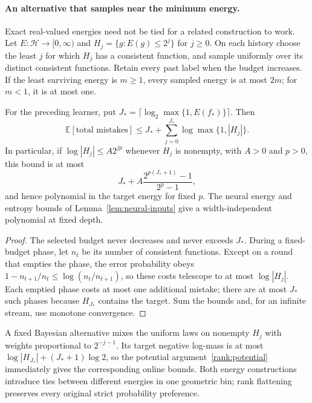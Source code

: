 \paragraph{An alternative that samples near the minimum energy.}
Exact real-valued energies need not be tied for a related construction
to work. Let $E:\mathcal H\to[0,\infty)$ and
$H_j=\{g:E(g)\le2^j\}$ for $j\ge0$. On each history choose the least $j$
for which $H_j$ has a consistent function, and sample uniformly over its
distinct consistent functions. Retain every past label when the budget
increases. If the least surviving energy is $m\ge1$, every sampled energy
is at most $2m$; for $m<1$, it is at most one.

\begin{corollary}\label{rank:bands}
For the preceding learner, put
$J_* =\lceil\log_2\max\{1,E(f_*)\}\rceil$. Then
\[
 \mathbb E[\text{total mistakes}]
 \le J_*+\sum_{j=0}^{J_*}\log\max\{1,|H_j|\}.
\]
In particular, if $\log|H_j|\le A2^{jp}$ whenever $H_j$ is nonempty,
with $A>0$ and $p>0$, this bound is at most
\[
 J_*+A\frac{2^{p(J_*+1)}-1}{2^p-1},
\]
and hence polynomial in the target energy for fixed $p$. The neural energy
and entropy bounds of Lemma~\ref{lem:neural-inputs} give a
width-independent polynomial at fixed depth.
\end{corollary}

\begin{proof}
The selected budget never decreases and never exceeds $J_*$. During a
fixed-budget phase, let $n_t$ be its number of consistent functions.
Except on a round that empties the phase, the error probability obeys
$1-n_{t+1}/n_t\le\log(n_t/n_{t+1})$, so these costs telescope to at most
$\log|H_j|$. Each emptied phase costs at most one additional mistake;
there are at most $J_*$ such phases because $H_{J_*}$ contains the target.
Sum the bounds and, for an infinite stream, use monotone convergence.
\end{proof}

A fixed Bayesian alternative mixes the uniform laws on nonempty $H_j$
with weights proportional to $2^{-j-1}$. Its target negative log-mass is
at most $\log|H_{J_*}|+(J_*+1)\log2$, so the potential
argument~\eqref{rank:potential} immediately gives the corresponding online
bounds. Both energy constructions introduce ties between different
energies in one geometric bin; rank flattening preserves every original
strict probability preference.
